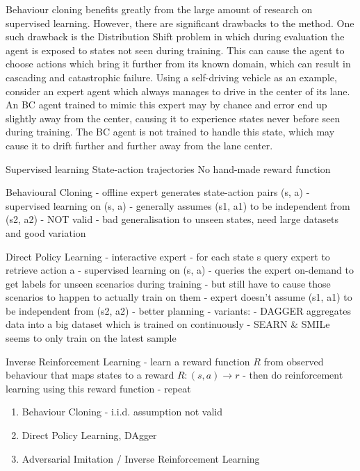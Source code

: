 Behaviour cloning benefits greatly from the large amount of research on supervised learning. 
However, there are significant drawbacks to the method.
One such drawback is the 
Distribution Shift problem 
in which during evaluation the agent is exposed to states
not seen during training.
This can cause the agent to choose actions which bring it further from its known domain,
which can result in cascading and catastrophic failure.
Using a self-driving vehicle as an example,
consider an expert agent which always manages to drive in the center of its lane.
An BC agent trained to mimic this expert may by chance and error end up slightly away from the center,
causing it to experience states never before seen during training.
The BC agent is not trained to handle this state,
which may cause it to drift further and further away from the lane center.


Supervised learning
State-action trajectories
No hand-made reward function

Behavioural Cloning
- offline expert generates state-action pairs (s, a)
- supervised learning on (s, a)
- generally assumes (s1, a1) to be independent from (s2, a2) - NOT valid
    - bad generalisation to unseen states, need large datasets and good variation

Direct Policy Learning
- interactive expert
- for each state s query expert to retrieve action a
  - supervised learning on (s, a)
- queries the expert on-demand to get labels for unseen scenarios during training
    - but still have to cause those scenarios to happen to actually train on them
- expert doesn't assume (s1, a1) to be independent from (s2, a2) - better planning
- variants:
    - DAGGER aggregates data into a big dataset which is trained on continuously
    - SEARN \& SMILe seems to only train on the latest sample

Inverse Reinforcement Learning
- learn a reward function $R$ from observed behaviour that maps states to a reward $R: (s, a) \rightarrow r$
- then do reinforcement learning using this reward function
- repeat 


\begin{enumerate}
    \item Behaviour Cloning - i.i.d. assumption not valid
    \item Direct Policy Learning, DAgger
    \item Adversarial Imitation / Inverse Reinforcement Learning
\end{enumerate}

